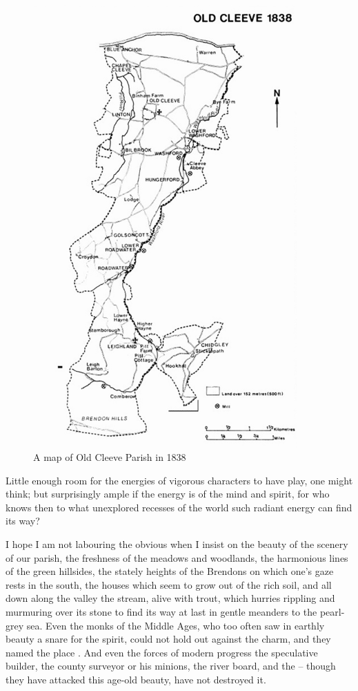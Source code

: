 \begin{figure}
	 \centering
     \includegraphics[width=0.9\textwidth]{figures/oldCleeve}
     \caption{A map of Old Cleeve Parish in 1838}
     \label{fig:OldCleeve}
\end{figure}
 
Little enough room for the energies of vigorous characters to have play, one might think; but surprisingly ample if the energy is of the mind and spirit, for who knows then to what unexplored recesses of the world such radiant energy can find its way? 

I hope I am not labouring the obvious when I insist on the beauty of the scenery of our parish, the freshness of the meadows and woodlands, the harmonious lines of the green hillsides, the stately heights of the Brendons on which one's gaze rests in the south, the houses which seem to grow out of the rich soil, and all down along the valley the stream, alive with trout, which hurries rippling and murmuring over its stone to find its way at last in gentle meanders to the pearl-grey sea. Even the monks of the Middle Ages, who too often saw in earthly beauty a snare for the spirit, could not hold out against the charm, and they named the place . And even the forces of modern progress the speculative builder, the county surveyor or his minions, the river board, and the  – though they have attacked this age-old beauty, have not destroyed it. 


